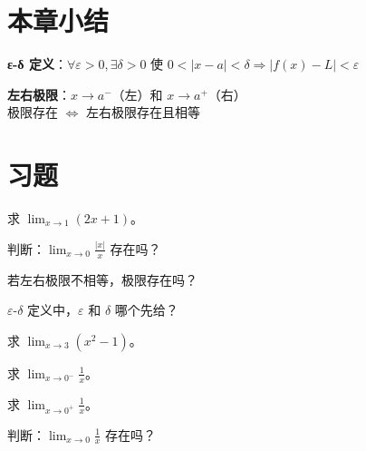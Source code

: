 \section{本章小结}

\begin{progressbox}
\textbf{ε-δ 定义}：\(\forall\varepsilon>0,\exists\delta>0\) 使 \(0<|x-a|<\delta \Rightarrow |f(x)-L|<\varepsilon\)

\textbf{左右极限}：\(x \to a^-\)（左）和 \(x \to a^+\)（右）\\
极限存在 \(\iff\) 左右极限存在且相等
\end{progressbox}

\section{习题}

\begin{exercise}[0]
求 \(\displaystyle\lim_{x\to 1} (2x+1)\)。
\end{exercise}
\begin{exercise}[0]
判断：\(\displaystyle\lim_{x\to 0} \frac{|x|}{x}\) 存在吗？
\end{exercise}
\begin{exercise}[0]
若左右极限不相等，极限存在吗？
\end{exercise}
\begin{exercise}[0]
\(\varepsilon\)-\(\delta\) 定义中，\(\varepsilon\) 和 \(\delta\) 哪个先给？
\end{exercise}

\begin{exercise}[1]
求 \(\displaystyle\lim_{x\to 3} (x^2-1)\)。
\end{exercise}
\begin{exercise}[1]
求 \(\displaystyle\lim_{x\to 0^-} \frac{1}{x}\)。
\end{exercise}
\begin{exercise}[1]
求 \(\displaystyle\lim_{x\to 0^+} \frac{1}{x}\)。
\end{exercise}
\begin{exercise}[1]
判断：\(\displaystyle\lim_{x\to 0} \frac{1}{x}\) 存在吗？
\end{exercise}


